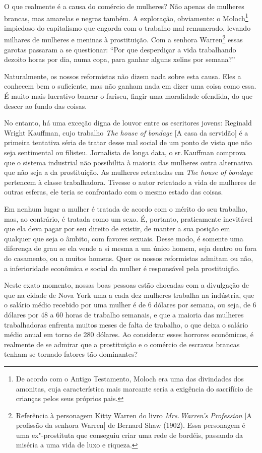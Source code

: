 O que realmente é a causa do comércio de mulheres? Não apenas de
mulheres brancas, mas amarelas e negras também. A exploração,
obviamente: o Moloch\footnote{De acordo com o Antigo Testamento, 
Moloch era uma das divindades dos amonitas, cuja característica mais marcante seria a exigência do sacrifício de crianças pelos seus próprios pais.} impiedoso do capitalismo que engorda com o trabalho
mal remunerado, levando milhares de mulheres e meninas à prostituição.
Com a senhora Warren\footnote{Referência à personagem Kitty Warren do
  livro \emph{Mrs.\,Warren's Profession} {[}A profissão da senhora Warren{]} de Bernard Shaw (1902). Essa personagem é uma
  ex"-prostituta que conseguiu criar uma rede de bordéis, passando da
  miséria a uma vida de luxo e riqueza.} essas garotas passaram a se
questionar: ``Por que desperdiçar a vida trabalhando dezoito horas por
dia, numa copa, para ganhar alguns xelins por semana?''

Naturalmente, os nossos reformistas não dizem nada sobre esta causa.
Eles a conhecem bem o suficiente, mas não ganham nada em dizer uma coisa
como essa. É muito mais lucrativo bancar o fariseu, fingir uma
moralidade ofendida, do que descer ao fundo das coisas.

No entanto, há uma exceção digna de louvor entre os escritores jovens:
Reginald Wright Kauffman, cujo trabalho \emph{The house of bondage}
{[}A casa da servidão{]} é a primeira tentativa séria de tratar
desse mal social de um ponto de vista que não seja sentimental ou
filisteu. Jornalista de longa data, o sr.\,Kauffman comprova que o
sistema industrial não possibilita à maioria das mulheres outra
alternativa que não seja a da prostituição. As mulheres retratadas em
\emph{The house of bondage} pertencem à classe trabalhadora. Tivesse o
autor retratado a vida de mulheres de outras esferas, ele teria se
confrontado com o mesmo estado das coisas.

Em nenhum lugar a mulher é tratada de acordo com o mérito do seu
trabalho, mas, ao contrário, é tratada como um sexo. É, portanto,
praticamente inevitável que ela deva pagar por seu direito de existir,
de manter a sua posição em qualquer que seja o âmbito, com favores
sexuais. Desse modo, é somente uma diferença de grau se ela vende a si
mesma a um único homem, seja dentro ou fora do casamento, ou a muitos
homens. Quer os nossos reformistas admitam ou não, a inferioridade
econômica e social da mulher é responsável pela prostituição.

Neste exato momento, nossas boas pessoas estão chocadas com a divulgação
de que na cidade de Nova York uma a cada dez mulheres trabalha na
indústria, que o salário médio recebido por uma mulher é de 6 dólares por
semana, ou seja, de 6 dólares por 48 a 60 horas de trabalho semanais, e que a
maioria das mulheres trabalhadoras enfrenta muitos meses de falta de
trabalho, o que deixa o salário médio anual em torno de 280 dólares. Ao
considerar esses horrores econômicos, é realmente de se admirar que a
prostituição e o comércio de escravas brancas tenham se tornado fatores
tão dominantes?

